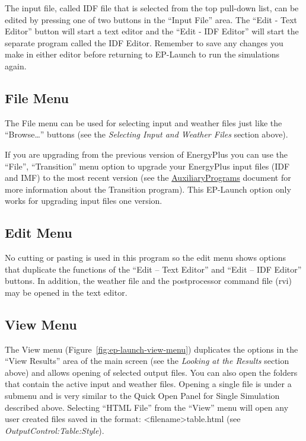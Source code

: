 The input file, called IDF file that is selected from the top pull-down list, can be edited by pressing one of two buttons in the ``Input File'' area. The ``Edit - Text Editor'' button will start a text editor and the ``Edit - IDF Editor'' will start the separate program called the IDF Editor. Remember to save any changes you make in either editor before returning to EP-Launch to run the simulations again.

\subsection{File Menu}\label{file-menu}

The File menu can be used for selecting input and weather files just like the ``Browse\ldots{}'' buttons (see the \emph{Selecting Input and Weather Files} section above).

If you are upgrading from the previous version of EnergyPlus you can use the ``File'', ``Transition'' menu option to upgrade your EnergyPlus input files (IDF and IMF) to the most recent version (see the \href{file:///E:/Docs4PDFs/AuxiliaryPrograms.pdf}{AuxiliaryPrograms} document for more information about the Transition program). This EP-Launch option only works for upgrading input files one version.

\subsection{Edit Menu}\label{edit-menu}

No cutting or pasting is used in this program so the edit menu shows options that duplicate the functions of the ``Edit -- Text Editor'' and ``Edit -- IDF Editor'' buttons. In addition, the weather file and the postprocessor command file (rvi) may be opened in the text editor.

\subsection{View Menu}\label{view-menu}

The View menu (Figure~\ref{fig:ep-launch-view-menu}) duplicates the options in the ``View Results'' area of the main screen (see the \emph{Looking at the Results} section above) and allows opening of selected output files. You can also open the folders that contain the active input and weather files. Opening a single file is under a submenu and is very similar to the Quick Open Panel for Single Simulation described above. Selecting ``HTML File'' from the ``View'' menu will open any user created files saved in the format: \textless{}filename\textgreater{}table.html (see \emph{OutputControl:Table:Style}).

